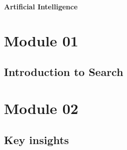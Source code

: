\documentclass[./main.tex]{subfiles}
\begin{document}
{\LARGE\bf Artificial Intelligence}

\vspace{12pt}

\section{Module 01}

\subsection{Introduction to Search}

\newpage

\section{Module 02}

\subsection{Key insights}
\end{document}

